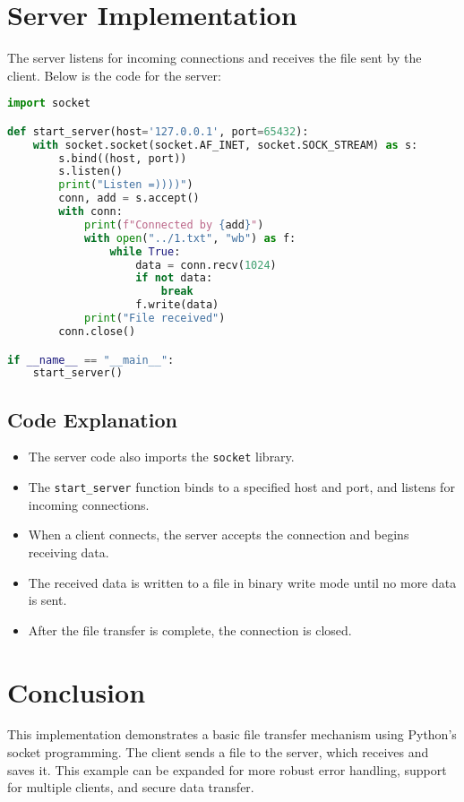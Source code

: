 \documentclass{article}
\begin{document}
\section{Server Implementation}
The server listens for incoming connections and receives the file sent by the client. Below is the code for the server:

\begin{lstlisting}[language=Python]
import socket

def start_server(host='127.0.0.1', port=65432):
    with socket.socket(socket.AF_INET, socket.SOCK_STREAM) as s:
        s.bind((host, port))
        s.listen()
        print("Listen =))))")
        conn, add = s.accept()
        with conn:
            print(f"Connected by {add}")
            with open("../1.txt", "wb") as f:
                while True:
                    data = conn.recv(1024)
                    if not data:
                        break
                    f.write(data)
            print("File received")
        conn.close()

if __name__ == "__main__":
    start_server()
\end{lstlisting}

\subsection{Code Explanation}
\begin{itemize}
    \item The server code also imports the \texttt{socket} library.
    \item The \texttt{start\_server} function binds to a specified host and port, and listens for incoming connections.
    \item When a client connects, the server accepts the connection and begins receiving data.
    \item The received data is written to a file in binary write mode until no more data is sent.
    \item After the file transfer is complete, the connection is closed.
\end{itemize}

\section{Conclusion}
This implementation demonstrates a basic file transfer mechanism using Python's socket programming. The client sends a file to the server, which receives and saves it. This example can be expanded for more robust error handling, support for multiple clients, and secure data transfer.
\end{document}
